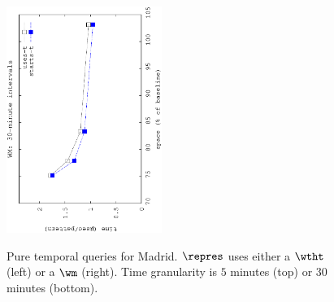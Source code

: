 \begin{figure}[!ht]
\begin{center}
\begin{center}
			{\includegraphics[angle=-90,width=0.45\textwidth]{figures_synt/madrid_t30mwm.eps}}
		\end{center}
	\end{center}
	\vspace{-0.5cm}
	\caption{Pure temporal queries for Madrid. $\repres$ uses either a $\wtht$ (left) or a $\wm$ (right). 
		Time granularity is $5$ minutes (top) or $30$ minutes (bottom).}
	\label{fig:madridst_topk}
	\vspace{-0.3cm}





\end{figure}
